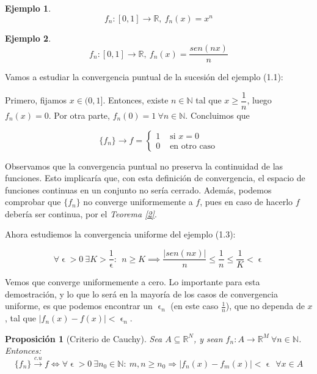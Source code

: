 \documentclass[11pt, a4paper]{article}
\newif\IfInSansMode
\let\epsilon\upvarepsilon
\providecommand{\abs}[1]{\lvert#1\rvert}
\newcommand{\R}{\mathbb{R}} \newcommand{\N}{\mathbb{N}}
\newcommand{\fn}{\{f_n\}}
\theoremstyle{theorem-style}
\newtheorem{nprop}{Proposición}[section]
\theoremstyle{definition-style}
\theoremstyle{remark-style}
\theoremstyle{example-style}
\newtheorem{ejemplo}{Ejemplo}[section]
\begin{document}
\begin{ejemplo}
  \[
    f_n : [0,1] \to \R,\ f_n(x) = x^n
  \]
\end{ejemplo}

\begin{ejemplo}
  \[
    f_n : [0,1] \to \R,\ f_n(x) = \dfrac{sen(nx)}{n}
  \]
\end{ejemplo}


Vamos a estudiar la convergencia puntual de la sucesión del ejemplo (1.1):

Primero, fijamos $x\in (0,1]$. Entonces, existe $n\in \N$ tal que $x \ge \dfrac{1}{n}$, luego $f_n(x) = 0$. Por otra parte, $f_n(0) = 1\ \forall n\in \N$. Concluimos que

\[
  \fn\to f = \begin{cases}
    1 & \text{ si } x=0\\
    0 & \text{ en otro caso}
  \end{cases}
\]

Observamos que la convergencia puntual no preserva la continuidad de las funciones. Esto implicaría que, con esta definición de convergencia, el espacio de funciones continuas en un conjunto no sería cerrado. Además, podemos comprobar que $\fn$ no converge uniformemente a $f$, pues en caso de hacerlo $f$ debería ser continua, por el \textit{Teorema \ref{2}}.

Ahora estudiemos la convergencia uniforme del ejemplo (1.3):

\[
  \forall\epsilon>0\ \exists K>\dfrac{1}{\epsilon}:\ \ n\ge K \implies \dfrac{\abs{sen(nx)}}{n} \le \dfrac{1}{n} \le \dfrac{1}{K} < \epsilon
\]

Vemos que converge uniformemente a cero. Lo importante para esta demostración, y lo que lo será en la mayoría de los casos de convergencia uniforme, es que podemos encontrar un $\epsilon_n$ (en este caso $\frac{1}{n}$), que no dependa de $x$, tal que $\abs{f_n(x)-f(x)} < \epsilon_n$.

\begin{nprop}[Criterio de Cauchy]
  Sea $A \subseteq \mathbb{R}^N$, y sean $f_n: A \longrightarrow \mathbb{R}^M \ \forall n \in \mathbb{N}$. Entonces: $$\fn \xrightarrow {c.u} f \iff \forall \epsilon > 0\ \exists n_0 \in \mathbb{N}:\ m,n \ge n_0 \Rightarrow |f_n(x) - f_m(x)| < \epsilon\ \ \forall x \in A$$
\end{nprop}
\end{document}
